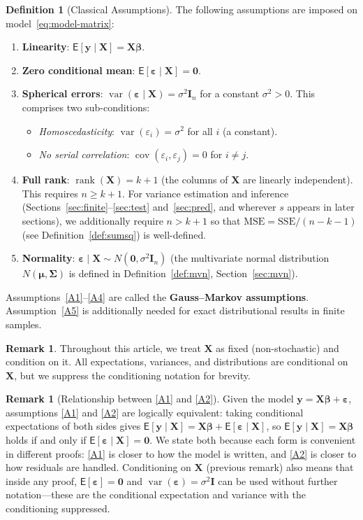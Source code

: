 \documentclass[12pt,a4paper]{article}
\theoremstyle{definition}
\newtheorem{definition}[theorem]{Definition}
\newtheorem{remark}[theorem]{Remark}
\newcommand\expc{\mathsf{E}}
\DeclareMathOperator\var{var}
\DeclareMathOperator\cov{cov}
\DeclareMathOperator\rank{rank}
\newcommand{\SSE}{\mathrm{SSE}}
\newcommand{\MSE}{\mathrm{MSE}}
\newcommand{\bX}{\mathbf{X}}
\newcommand{\by}{\mathbf{y}}
\def\bb{\boldsymbol{\beta}}
\newcommand{\be}{\boldsymbol{\varepsilon}}
\newcommand{\bI}{\mathbf{I}}
\newcommand{\bzero}{\mathbf{0}}
\begin{document}
\begin{definition}[Classical Assumptions]\label{def:assumptions}
The following assumptions are imposed on model~\eqref{eq:model-matrix}:
\begin{enumerate}[label=\textup{(A\arabic*)}]
\item\label{A1} \textbf{Linearity}: $\expc[\by \mid \bX] = \bX\bb$.
\item\label{A2} \textbf{Zero conditional mean}: $\expc[\be \mid \bX] = \bzero$.
\item\label{A3} \textbf{Spherical errors}: $\var(\be \mid \bX) = \sigma^2 \bI_n$ for a constant $\sigma^2 > 0$. This comprises two sub-conditions:
\begin{itemize}
    \item \emph{Homoscedasticity}: $\var(\varepsilon_i) = \sigma^2$ for all $i$ (a constant).
    \item \emph{No serial correlation}: $\cov(\varepsilon_i, \varepsilon_j) = 0$ for $i \neq j$.
\end{itemize}
\item\label{A4} \textbf{Full rank}: $\rank(\bX) = k + 1$ (the columns of $\bX$ are linearly independent). This requires $n \geqslant k + 1$. For variance estimation and inference (Sections~\ref{sec:finite}--\ref{sec:test} and~\ref{sec:pred}, and wherever $s$ appears in later sections), we additionally require $n > k + 1$ so that $\MSE = \SSE/(n-k-1)$ (see Definition~\ref{def:sumsq}) is well-defined.
\item\label{A5} \textbf{Normality}: $\be \mid \bX \sim N(\bzero, \sigma^2 \bI_n)$ (the multivariate normal distribution $N(\boldsymbol\mu, \boldsymbol\Sigma)$ is defined in Definition~\ref{def:mvn}, Section~\ref{sec:mvn}).
\end{enumerate}
Assumptions~\ref{A1}--\ref{A4} are called the \textbf{Gauss--Markov assumptions}. Assumption~\ref{A5} is additionally needed for exact distributional results in finite samples.
\end{definition}

\begin{remark}\label{rem:fixed-X}
Throughout this article, we treat $\bX$ as fixed (non-stochastic) and condition on it. All expectations, variances, and distributions are conditional on $\bX$, but we suppress the conditioning notation for brevity.
\end{remark}

\begin{remark}[Relationship between \ref{A1} and \ref{A2}]\label{rem:A1-A2}
Given the model $\by = \bX\bb + \be$, assumptions \ref{A1} and \ref{A2} are logically equivalent: taking conditional expectations of both sides gives $\expc[\by\mid\bX] = \bX\bb + \expc[\be\mid\bX]$, so $\expc[\by\mid\bX] = \bX\bb$ holds if and only if $\expc[\be\mid\bX] = \bzero$. We state both because each form is convenient in different proofs: \ref{A1} is closer to how the model is written, and \ref{A2} is closer to how residuals are handled. Conditioning on $\bX$ (previous remark) also means that inside any proof, $\expc[\be] = \bzero$ and $\var(\be) = \sigma^2\bI$ can be used without further notation---these are the conditional expectation and variance with the conditioning suppressed.
\end{remark}
\end{document}
